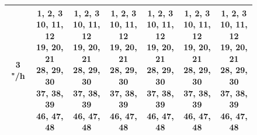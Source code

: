 \documentclass{article}
\begin{document}
\begin{figure}[H]
\begin{tabular}{|c|c|c|c|c|c|c|}
3 "/h & \makecell{1, 2, 3 \\ 10, 11, 12 \\ 19, 20, 21 \\ 28, 29, 30 \\ 37, 38, 39 \\ 46, 47, 48} & \makecell{1, 2, 3 \\ 10, 11, 12 \\ 19, 20, 21 \\ 28, 29, 30 \\ 37, 38, 39 \\ 46, 47, 48} & \makecell{1, 2, 3 \\ 10, 11, 12 \\ 19, 20, 21 \\ 28, 29, 30 \\ 37, 38, 39 \\ 46, 47, 48}  & \makecell{1, 2, 3 \\ 10, 11, 12 \\ 19, 20, 21 \\ 28, 29, 30 \\ 37, 38, 39 \\ 46, 47, 48} & \makecell{1, 2, 3 \\ 10, 11, 12 \\ 19, 20, 21 \\ 28, 29, 30 \\ 37, 38, 39 \\ 46, 47, 48} & \makecell{1, 2, 3 \\ 10, 11, 12 \\ 19, 20, 21 \\ 28, 29, 30 \\ 37, 38, 39 \\ 46, 47, 48}\\
\hline

\end{tabular}
\end{figure}
\end{document}
